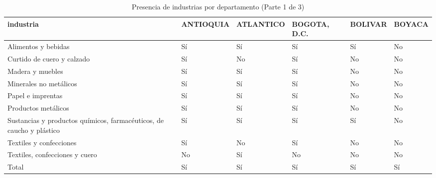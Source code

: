 \documentclass[12pt]{article}
\begin{document}
\setcounter{table}{1}
\begin{table}[htbp]
\centering
\large

\caption{Presencia de industrias por departamento (Parte 1 de 3)}
\begin{tabular}[t]{llllll}
\toprule
industria & ANTIOQUIA & ATLANTICO & BOGOTA, D.C. & BOLIVAR & BOYACA\\
\midrule
Alimentos y bebidas & Sí & Sí & Sí & Sí & No\\
Curtido de cuero y calzado & Sí & No & Sí & No & No\\
Madera y muebles & Sí & Sí & Sí & No & No\\
Minerales no metálicos & Sí & Sí & Sí & No & No\\
Papel e imprentas & Sí & Sí & Sí & No & No\\
\addlinespace
Productos metálicos & Sí & Sí & Sí & No & No\\
Sustancias y productos químicos, farmacéuticos, de caucho y plástico & Sí & Sí & Sí & Sí & No\\
Textiles y confecciones & Sí & No & Sí & No & No\\
Textiles, confecciones y cuero & No & Sí & No & No & No\\
Total & Sí & Sí & Sí & Sí & Sí\\
\bottomrule
\end{tabular}
\end{table}
\end{document}
